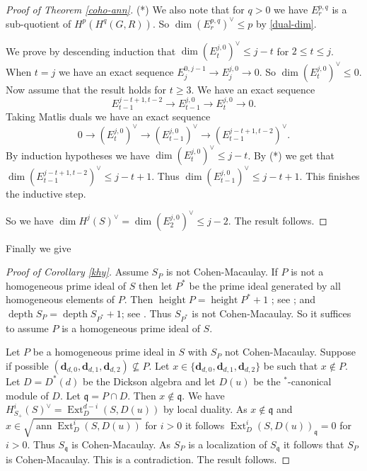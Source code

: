 \documentclass{amsart}
\newcommand{\CM}{Cohen-Macaulay}
\newcommand{\db}{\mathbf{d} }
\newcommand{\q}{\mathfrak{q} }
\newcommand{\rt}{\rightarrow}
\newcommand{\depth}{\operatorname{depth}}
\newcommand{\ann}{\operatorname{ann}}
\newcommand{\height}{\operatorname{height}}
\newcommand{\Ext}{\operatorname{Ext}}
\theoremstyle{plain}
\theoremstyle{definition}
\theoremstyle{remark}
\begin{document}
\begin{proof}[Proof of Theorem \ref{coho-ann}]
(*) We also note that for $q > 0$ we have $E^{p,q}_r$ is a sub-quotient of $H^p(H^q(G,R))$. So $\dim (E^{p,q}_r)^\vee \leq p$ by \ref{dual-dim}.


We prove by descending induction that $\dim (E^{j,0}_t)^\vee \leq j -t$ for $2 \leq t \leq j$.
When $t =j$ we have an exact sequence $E^{0,j-1}_j \rt E_j^{j,0} \rt 0$. So  $\dim (E^{j,0}_t)^\vee \leq 0$. Now assume that the result holds for $t \geq 3$.
We have an exact sequence
$$E^{j-t+1, t-2}_{t-1} \rt E^{j,0}_{t-1} \rt E^{j,0}_t \rt 0.$$
Taking Matlis duals we have an exact sequence
$$ 0 \rt (E^{j,0}_t)^\vee \rt (E^{j,0}_{t-1})^\vee \rt (E^{j-t+1, t-2}_{t-1})^\vee.$$
By induction hypotheses we have $\dim (E^{j,0}_t)^\vee \leq j-t$. By (*) we get that \\
 $\dim (E^{j-t+1, t-2}_{t-1})^\vee \leq j-t + 1$. Thus
 $\dim (E^{j,0}_{t-1})^\vee \leq  j-t + 1$. This finishes the inductive step.

 So we have $\dim H^j(S)^\vee = \dim (E^{j,0}_2)^\vee \leq j - 2$. The result follows.
\end{proof}
Finally we give
\begin{proof}[Proof of Corollary \ref{khy}]
Assume $S_P$ is not \CM.
If $P$ is not a homogeneous prime ideal of $S$ then let $P^*$ be the prime ideal generated by all homogeneous elements of $P$. Then $\height P = \height P^* + 1$ ; see \cite[1.5.8]{BH}; and $\depth S_P = \depth S_{P^*} + 1$; see \cite[1.5.9]{BH}. Thus $S_{P^*}$ is not \CM. So it suffices to assume $P$ is a homogeneous prime ideal of $S$.

Let $P$ be a homogeneous prime ideal in $S$ with $S_P$ not \CM. Suppose if possible $(\db_{d,0}, \db_{d, 1}, \db_{d,2}) \nsubseteq P$. Let $x \in \{\db_{d,0}, \db_{d, 1}, \db_{d,2}\}$ be such that $x \notin P$. Let $D = D^*(d)$ be the Dickson algebra and let $D(u)$ be the $^*$-canonical module of $D$. Let $\q = P \cap D$. Then $x\notin \q$. We have $H^i_{S_+}(S)^\vee = \Ext^{d-i}_D(S, D(u))$ by local duality. As $x \notin \q$ and $x \in \sqrt{\ann \Ext^{i}_D(S, D(u))}$ for $i > 0$ it follows $\Ext^{i}_D(S, D(u))_\q = 0$ for $i > 0$. Thus  $S_\q$ is \CM. As $S_P$ is a localization of $S_\q$ it follows that $S_P$ is \CM. This is a contradiction. The result follows.



\end{proof}
\end{document}
